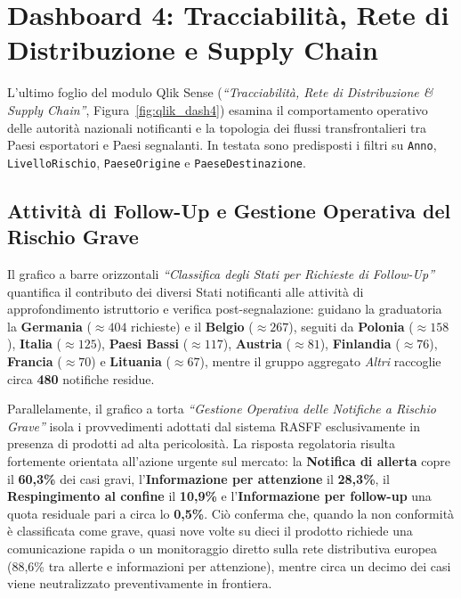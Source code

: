 \section{Dashboard 4: Tracciabilità, Rete di Distribuzione e Supply Chain}
\label{sec:qlik_dash4}

L'ultimo foglio del modulo Qlik Sense (\textit{``Tracciabilità, Rete di Distribuzione \& Supply Chain''}, Figura~\ref{fig:qlik_dash4}) esamina il comportamento operativo delle autorità nazionali notificanti e la topologia dei flussi transfrontalieri tra Paesi esportatori e Paesi segnalanti. In testata sono predisposti i filtri su \texttt{Anno}, \texttt{LivelloRischio}, \texttt{PaeseOrigine} e \texttt{PaeseDestinazione}.


\subsection{Attività di Follow-Up e Gestione Operativa del Rischio Grave}
Il grafico a barre orizzontali \textit{``Classifica degli Stati per Richieste di Follow-Up''} quantifica il contributo dei diversi Stati notificanti alle attività di approfondimento istruttorio e verifica post-segnalazione: guidano la graduatoria la \textbf{Germania} ($\approx 404$ richieste) e il \textbf{Belgio} ($\approx 267$), seguiti da \textbf{Polonia} ($\approx 158$), \textbf{Italia} ($\approx 125$), \textbf{Paesi Bassi} ($\approx 117$), \textbf{Austria} ($\approx 81$), \textbf{Finlandia} ($\approx 76$), \textbf{Francia} ($\approx 70$) e \textbf{Lituania} ($\approx 67$), mentre il gruppo aggregato \textit{Altri} raccoglie circa \textbf{480} notifiche residue.

Parallelamente, il grafico a torta \textit{``Gestione Operativa delle Notifiche a Rischio Grave''} isola i provvedimenti adottati dal sistema RASFF esclusivamente in presenza di prodotti ad alta pericolosità. La risposta regolatoria risulta fortemente orientata all'azione urgente sul mercato: la \textbf{Notifica di allerta} copre il \textbf{60,3\%} dei casi gravi, l'\textbf{Informazione per attenzione} il \textbf{28,3\%}, il \textbf{Respingimento al confine} il \textbf{10,9\%} e l'\textbf{Informazione per follow-up} una quota residuale pari a circa lo \textbf{0,5\%}. Ciò conferma che, quando la non conformità è classificata come grave, quasi nove volte su dieci il prodotto richiede una comunicazione rapida o un monitoraggio diretto sulla rete distributiva europea (88,6\% tra allerte e informazioni per attenzione), mentre circa un decimo dei casi viene neutralizzato preventivamente in frontiera.

